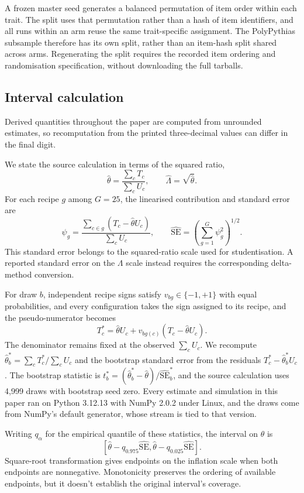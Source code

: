 A frozen master seed generates a balanced permutation of item order within each trait. The split uses that permutation rather than a hash of item identifiers, and all runs within an arm reuse the same trait-specific assignment. The PolyPythias subsample therefore has its own split, rather than an item-hash split shared across arms. Regenerating the split requires the recorded item ordering and randomisation specification, without downloading the full tarballs.

\subsection{Interval calculation}
Derived quantities throughout the paper are computed from unrounded estimates, so recomputation from the printed three-decimal values can differ in the final digit.

We state the source calculation in terms of the squared ratio,
\[
\widehat\theta=\frac{\sum_cT_c}{\sum_cU_c},\qquad
\widehat\Lambda=\sqrt{\widehat\theta}. \]
For each recipe $g$ among $G=25$, the linearised contribution and standard error are
\begin{equation}
\psi_g=\frac{\sum_{c\in g}(T_c-\widehat\theta U_c)}{\sum_cU_c},
\qquad
\widehat{\mathrm{SE}}=\left(\sum_{g=1}^{G}\psi_g^2\right)^{1/2}. \label{eq:bootstrap}
\end{equation}
This standard error belongs to the squared-ratio scale used for studentisation. A reported standard error on the $\Lambda$ scale instead requires the corresponding delta-method conversion.

For draw $b$, independent recipe signs satisfy $v_{bg}\in\{-1,+1\}$ with equal probabilities, and every configuration takes the sign assigned to its recipe, and the pseudo-numerator becomes \[ T_c^*=\widehat\theta U_c+v_{bg(c)}(T_c-\widehat\theta U_c). \]
The denominator remains fixed at the observed $\sum_cU_c$. We recompute $\widehat\theta_b^*=\sum_cT_c^*/\sum_cU_c$ and the bootstrap standard error from the residuals $T_c^*-\widehat\theta_b^*U_c$. The bootstrap statistic is $t_b^*=(\widehat\theta_b^*-\widehat\theta)/\widehat{\mathrm{SE}}_b^*$, and the source calculation uses 4,999 draws with bootstrap seed zero. Every estimate and simulation in this paper ran on Python 3.12.13 with NumPy 2.0.2 under Linux, and the draws come from NumPy's default generator, whose stream is tied to that version.

Writing $q_\alpha$ for the empirical quantile of these statistics, the interval on $\theta$ is
\[
\left[\widehat\theta-q_{0.975}\widehat{\mathrm{SE}},
\widehat\theta-q_{0.025}\widehat{\mathrm{SE}}\right]. \]
Square-root transformation gives endpoints on the inflation scale when both endpoints are nonnegative. Monotonicity preserves the ordering of available endpoints, but it doesn't establish the original interval's coverage.

